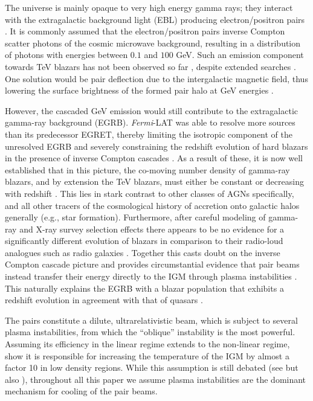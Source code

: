 \documentclass[numberedappendix]{emulateapj}
\begin{document}
The universe is mainly opaque to very high energy gamma rays; they interact with the extragalactic background light (EBL) producing electron/positron pairs \citep{1967PhRv..155.1408G,1992ApJ...390L..49S}. It is commonly assumed that the electron/positron pairs inverse Compton scatter photons of the cosmic microwave background, resulting in a distribution of photons with energies between $0.1$ and $100$ GeV. Such an emission component towards TeV blazars has not been observed so far \citep{2010A&A...524A..77A}, despite extended searches \citep{2014A&A...562A.145H}. One solution would be pair deflection due to the intergalactic magnetic field, thus lowering the surface brightness of the formed pair halo at GeV energies \citep{2013A&ARv..21...62D,2012ApJ...747L..14V,2011ApJ...733L..21D}. 

However, the cascaded GeV emission would still contribute to the extragalactic gamma-ray background (EGRB). \textit{Fermi}-LAT was able to resolve more sources than its predecessor EGRET, thereby limiting the isotropic component of the unresolved EGRB and severely constraining the redshift evolution of hard blazars in the presence of inverse Compton cascades \citep[e.g.,][]{Vent:10,Murase:2012,Inoue:2012}. As a result of these, it is now well established that in this picture, the co-moving number density of gamma-ray blazars, and by extension the TeV blazars, must either be constant or decreasing with redshift \citep{Knei-Mann:08,Vent:10,Abazajian:2011,Inoue:2012}.  This lies in stark contrast to other classes of AGNs specifically, and all other tracers of the cosmological history of accretion onto galactic halos generally (e.g., star formation).  Furthermore, after careful modeling of gamma-ray and X-ray survey selection effects there appears to be no evidence for a significantly different evolution of blazars in comparison to their radio-loud analogues such as radio galaxies \citep{Giommi:2012,Giommi:2013}. Together this casts doubt on the inverse Compton cascade picture and provides circumstantial evidence that pair beams instead transfer their energy directly to the IGM through plasma instabilities \citep{2012ApJ...752...22B, 2012ApJ...758..102S, 2013ApJ...777...49S,2014ApJ...797..110C}. This naturally explains the EGRB with a blazar population that exhibits a redshift evolution in agreement with that of quasars \citep{2014ApJ...790..137B,2014ApJ...796...12B}.

The pairs constitute a dilute, ultrarelativistic beam, which is subject to several plasma instabilities, from which the ``oblique'' instability \citep{PhysRevE.70.046401} is the most powerful. Assuming its efficiency in the linear regime extends to the non-linear regime, \citet{2012ApJ...752...23C} show it is responsible for increasing the temperature of the IGM by almost a factor 10 in low density regions. While this assumption is still debated (see \citet{2013ApJ...770...54M,2014ApJ...787...49S} but also \citet{2013ApJ...777...49S,2012ApJ...758..102S,2014ApJ...797..110C}), throughout all this paper we assume plasma instabilities are the dominant mechanism for cooling of the pair beams.
\end{document}
